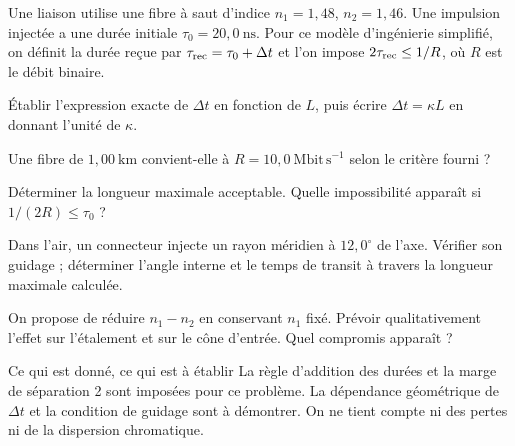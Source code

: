 \label{ch01-ex-D2}
Une liaison utilise une fibre à saut d'indice $n_1=1{,}48$, $n_2=1{,}46$. Une impulsion injectée a une durée initiale $\tau_0=20{,}0\ \mathrm{ns}$. Pour ce modèle d'ingénierie simplifié, on définit la durée reçue par $\tau_{\rm rec}=\tau_0+\Delta t$ et l'on impose $2\tau_{\rm rec}\leq1/R$, où $R$ est le débit binaire.
\begin{questions}
\item Établir l'expression exacte de $\Delta t$ en fonction de $L$, puis écrire $\Delta t=\kappa L$ en donnant l'unité de $\kappa$.
\item Une fibre de $1{,}00\ \mathrm{km}$ convient-elle à $R=10{,}0\ \mathrm{Mbit\,s^{-1}}$ selon le critère fourni ?
\item Déterminer la longueur maximale acceptable. Quelle impossibilité apparaît si $1/(2R)\leq\tau_0$ ?
\item Dans l'air, un connecteur injecte un rayon méridien à $12{,}0^\circ$ de l'axe. Vérifier son guidage ; déterminer l'angle interne et le temps de transit à travers la longueur maximale calculée.
\item On propose de réduire $n_1-n_2$ en conservant $n_1$ fixé. Prévoir qualitativement l'effet sur l'étalement et sur le cône d'entrée. Quel compromis apparaît ?
\end{questions}
\begin{docu}{Ce qui est donné, ce qui est à établir}
La règle d'addition des durées et la marge de séparation 2 sont imposées pour ce problème. La dépendance géométrique de $\Delta t$ et la condition de guidage sont à démontrer. On ne tient compte ni des pertes ni de la dispersion chromatique.
\end{docu}

